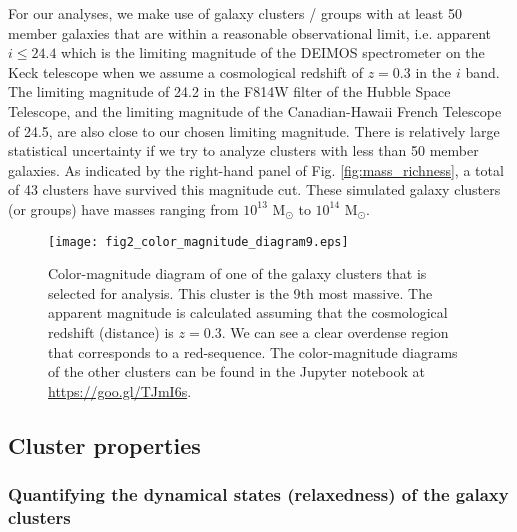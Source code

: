 For our analyses, we make use of galaxy clusters / groups 
with at least 50 member galaxies that are within a reasonable observational limit, 
i.e. apparent $i \leq 24.4$ which is the limiting magnitude of the DEIMOS
spectrometer on the Keck telescope when we assume a cosmological redshift of $z = 0.3$
in the $i$ band. The limiting magnitude of 24.2 in the
F814W filter of the Hubble Space Telescope, and the limiting magnitude of the
Canadian-Hawaii French Telescope of 24.5, 
are also close to our chosen limiting magnitude. 
There is relatively large statistical uncertainty if we try
to analyze clusters with less than 50 member galaxies. 
As indicated by the right-hand panel of Fig. \ref{fig:mass_richness}, 
a total of 43 clusters have 
survived this magnitude cut. These simulated galaxy clusters (or groups) have 
masses ranging from $10^{13}$ M$_\odot $ to $10^{14}$ M$_\odot$.  

\begin{figure}
	\centering
	\texttt{[image: fig2\_color\_magnitude\_diagram9.eps]}
	\caption{Color-magnitude diagram of one of the galaxy clusters that is selected for 
		analysis. This cluster is the 9th most massive. 
		The apparent magnitude is calculated assuming that 
		the cosmological redshift (distance) is $z = 0.3$. 
		We can see a clear overdense region that corresponds to a red-sequence.
		The color-magnitude diagrams of the other clusters can be found in the
		Jupyter notebook at \href{https://github.com/karenyyng/galaxy_DM_offset/blob/master/code/analyses/fig2_color_magnitude_diagram.ipynb}{https://goo.gl/TJmI6s}.
		\label{fig:color_magnitude_diagram}
	} 
\end{figure}

\subsection{Cluster properties}
\label{subsec:cluster_properties}

\subsubsection{Quantifying the dynamical states (relaxedness) of the galaxy clusters}
\label{subsubsec:relaxedness}

